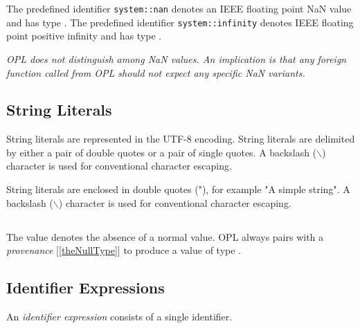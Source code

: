\documentclass{article}
\begin{document}
\NumberLiteral{}
\LEXDECIMAL{}
\LEXHEX{}
\LEXFRAC{}
\LEXEXPO{}
\LEXFLOAT{}
\LEXINT{}

The predefined identifier {\tt system::nan}  denotes an IEEE floating point NaN value and has type \FSIXTYFOUR{}.
The predefined identifier {\tt system::infinity} denotes IEEE floating point positive infinity and has type \FSIXTYFOUR{}.

{\em
OPL does not distinguish among NaN values. An implication is that any foreign function called from OPL should not expect any specific NaN variants.
}



\subsection{String Literals}
\label{stringLiterals}

String literals are represented in the UTF-8 encoding. String literals are delimited by either a pair of double quotes or a pair of single quotes. A backslash ($\backslash$) character is used for conventional character escaping.

\StringLiteral{}

\LEXDQSTRING{}

\LEXDQCHAR{}

\LEXLINETERMINAL{}

\LEXESCAPE{}

\LEXSQSTRING{}

\LEXSQCHAR{}


String literals are enclosed in double quotes (\textsf{"}), for example \textsf{"}A simple  string\textsf{"}. A backslash ($\backslash$) character is used for conventional character escaping.



\subsection{\NULL}
\label{null}

The value  \NULL{} denotes the absence of a normal value. OPL always pairs \NULL{} with a {\em provenance}  [\ref{theNullType}] to produce a value of type \NULLTYPE.

\subsection{Identifier Expressions}
\label{identifierExpressions}

An {\em identifier expression} consists of a single identifier.
\end{document}
